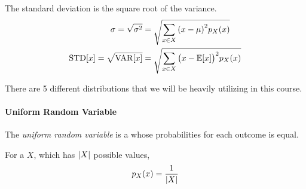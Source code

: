 \begin{definition}
  The standard deviation is the square root of the variance.
  \begin{equation}\label{eq:Discrete_Random_Variable-Standard_Deviation}
    \begin{aligned}
      \sigma = \sqrt{\sigma^{2}} &= \sqrt{\sum\limits_{x \in X} {\left( x - \mu \right)}^{2} p_{X}(x)} \\
      \operatorname{\operatorname{STD}}[x] = \sqrt{\operatorname{\operatorname{VAR}}[x]} &= \sqrt{\sum\limits_{x \in X} {\bigl( x - \operatorname{\operatorname{\mathbb{E}}}[x] \bigr)}^{2} p_{X}(x)} \\
    \end{aligned}
  \end{equation}
\end{definition}

There are 5 different  distributions that we will be heavily utilizing in this course.

\paragraph{Uniform Random Variable}\label{par:Uniform_Random_Variable}
\begin{definition}\label{def:Uniform_Random_Variable}
  The \emph{uniform random variable} is a  whose probabilities for each outcome is equal.

  For a  $X$, which has $\lvert X \rvert$ possible values,
  \begin{equation}\label{eq:Uniform_Random_Variable-Probability_Distribution}
    p_{X}(x) = \frac{1}{\lvert X \rvert}
  \end{equation}
\end{definition}

